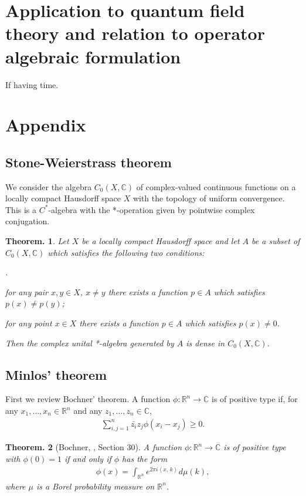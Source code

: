 \documentclass[openany, a4paper, oneside]{jsbook}
\newcounter{enum2}
\renewenvironment{enumerate}{%
\begin{list}%
{%
\arabic{enum2}.\ \,%
}%
{%
\usecounter{enum2}
\setlength{\itemindent}{0pt}%
\setlength{\leftmargin}{15pt}%
\setlength{\rightmargin}{0pt}%
\setlength{\labelsep}{0pt}%
\setlength{\labelwidth}{6pt}%
\setlength{\itemsep}{0pt}%
\setlength{\parsep}{0pt}%
\setlength{\listparindent}{0pt}%
}
}{%
\end{list}%
}
\theoremstyle{break}
\newtheorem{thm}{Theorem.}[section]
\theoremstyle{breakdefn}
\newcommand{\bkt}[2]{\left\langle#1,\,#2\right\rangle}
\newcommand{\bbC}{\mathbb{C}}
\newcommand{\bbRn}{\mathbb{R}^n}
\begin{document}
\section{Application to quantum field theory and relation to operator algebraic formulation}


If having time.
\section{Appendix}

\subsection{Stone-Weierstrass theorem}


We consider the algebra $C_0 (X, \bbC)$ of complex-valued continuous functions on
a locally compact Hausdorff space $X$ with the topology of uniform convergence.
This is a $C^*$-algebra with the *-operation given by pointwise complex conjugation.
\begin{thm}
 Let $X$ be a locally compact Hausdorff space and let $A$ be a subset of $C_0 (X, \bbC)$ which satisfies the following two conditions:
\begin{enumerate}
\item for any pair $x, y \in X$, $x \neq y$ there exists a function $p \in A$ which satisfies $p (x) \neq p (y)$;
\item for any point $x \in X$ there exists a function $p \in A$ which satisfies $p (x) \neq 0$.
\end{enumerate}
 Then the complex unital *-algebra generated by $A$ is dense in $C_0 (X, \bbC)$.
\end{thm}
\subsection{Minlos' theorem}


First we review Bochner' theorem.
A function $\phi \colon \bbRn \to \bbC$ is of positive type if, for any $x_1, \dots, x_n \in \bbRn$ and any $z_1, \dots, z_n \in \bbC$,
\begin{align}
 \sum_{i,j=1}^n \bar{z_i} z_j \phi (x_i - x_j) \geq 0.
\end{align}
\begin{thm}[Bochner, \cite{SeizoIto1}, Section 30]
 A function $\phi \colon \bbRn \to \bbC$ is of positive type with $\phi (0) = 1$ if and only if $\phi$ has the form
 \begin{align}
  \phi (x)
  =
  \int_{\bbRn} e^{2 \pi i \bkt{x}{k}} d \mu (k),
 \end{align}
 where $\mu$ is a Borel probability measure on $\bbRn$.
\end{thm}
\end{document}
